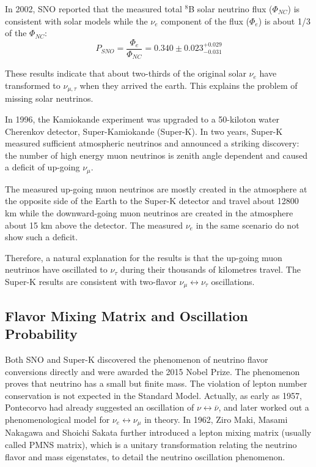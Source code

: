 \documentclass[preprint,12pt]{elsarticle}
\numberwithin{equation}{section}
\begin{document}
In 2002, SNO reported that the measured total $^8$B solar neutrino flux ($\Phi_{NC}$) is consistent with solar models while the $\nu_e$ component of the flux ($\Phi_e$) is about 1/3 of the $\Phi_{NC}$\cite{SNO}:
\[
P_{SNO} = \frac{\Phi_e}{\Phi_{NC}}= 0.340\pm0.023^{+0.029}_{-0.031}
\]

These results indicate that about two-thirds of the original solar $\nu_e$ have transformed to $\nu_{\mu,\tau}$ when they arrived the earth. This explains the problem of missing solar neutrinos.

In 1996, the Kamiokande experiment was upgraded to a 50-kiloton water Cherenkov detector, Super-Kamiokande (Super-K). In two years, Super-K measured sufficient atmospheric neutrinos and announced a striking discovery: the number of high energy muon neutrinos is zenith angle dependent and caused a deficit of up-going $\nu_\mu$. 

The measured up-going muon neutrinos are mostly created in the atmosphere at the opposite side of the Earth to the Super-K detector and travel about 12800 km while the downward-going muon neutrinos are created in the atmosphere about 15 km above the detector. The measured $\nu_e$ in the same scenario do not show such a deficit.

Therefore, a natural explanation for the results is that the up-going muon neutrinos have oscillated to $\nu_\tau$ during their thousands of kilometres travel. The Super-K results are consistent with two-flavor $\nu_\mu\leftrightarrow\nu_\tau$ oscillations\cite{superK}.


\subsection{Flavor Mixing Matrix and Oscillation Probability}
Both SNO and Super-K discovered the phenomenon of neutrino flavor conversions directly and were awarded the 2015 Nobel Prize. The phenomenon proves that neutrino has a small but finite mass. The violation of lepton number conservation is not expected in the Standard Model. Actually, as early as 1957, Pontecorvo had already suggested an oscillation of $\nu\leftrightarrow\bar{\nu}$, and later worked out a phenomenological model for $\nu_e\leftrightarrow\nu_\mu$ in theory\cite{nobeldoc}. In 1962, Ziro Maki, Masami Nakagawa and Shoichi Sakata further introduced a lepton mixing matrix (usually called PMNS matrix), which is a unitary transformation relating the neutrino flavor and mass eigenstates, to detail the neutrino oscillation phenomenon.
\end{document}
